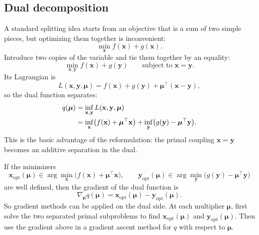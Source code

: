 \subsection{Dual decomposition}
\label{subsec:ch8-dual-decomposition}
A standard splitting idea starts from an objective that is a
sum of two simple pieces, but optimizing them together is inconvenient:
\[
  \min_{\mathbf{x}} f(\mathbf{x}) + g(\mathbf{x}).
\]
Introduce two copies of the variable and tie them together by an equality:
\begin{equation}
  \label{eq:ch8-dual-decomposition-primal}
  \min_{\mathbf{x},\mathbf{y}} f(\mathbf{x}) + g(\mathbf{y})
  \qquad
  \text{subject to }
  \mathbf{x}=\mathbf{y}.
\end{equation}
Its Lagrangian is
\[
  L(\mathbf{x},\mathbf{y},\boldsymbol{\mu})
  =
  f(\mathbf{x}) + g(\mathbf{y}) + \boldsymbol{\mu}^\top(\mathbf{x}-\mathbf{y}),
\]
so the dual function separates:
\begin{align}
  q(\boldsymbol{\mu})
  &=
  \inf_{\mathbf{x},\mathbf{y}}
  L(\mathbf{x},\mathbf{y},\boldsymbol{\mu}) \notag \\
  &=
  \inf_{\mathbf{x}}
  \bigl(f(\mathbf{x})+\boldsymbol{\mu}^\top \mathbf{x}\bigr)
  +
  \inf_{\mathbf{y}}
  \bigl(g(\mathbf{y})-\boldsymbol{\mu}^\top \mathbf{y}\bigr).
  \label{eq:ch8-dual-decomposition-q}
\end{align}
This is the basic advantage of the reformulation: the primal coupling
$\mathbf{x}=\mathbf{y}$ becomes an additive separation in the dual.

If the minimizers
\[
  \mathbf{x}_{\mathrm{opt}}(\boldsymbol{\mu})
  \in
  \arg\min_{\mathbf{x}}
  \bigl(f(\mathbf{x})+\boldsymbol{\mu}^\top \mathbf{x}\bigr),
  \qquad
  \mathbf{y}_{\mathrm{opt}}(\boldsymbol{\mu})
  \in
  \arg\min_{\mathbf{y}}
  \bigl(g(\mathbf{y})-\boldsymbol{\mu}^\top \mathbf{y}\bigr)
\]
are well defined, then the gradient of the dual function is
\[
  \nabla_{\boldsymbol{\mu}} q(\boldsymbol{\mu})
  =
  \mathbf{x}_{\mathrm{opt}}(\boldsymbol{\mu})
  -
  \mathbf{y}_{\mathrm{opt}}(\boldsymbol{\mu}).
\]
So gradient methods can be applied on the dual side. At each multiplier
$\boldsymbol{\mu}$, first solve the two separated primal subproblems to find
$\mathbf{x}_{\mathrm{opt}}(\boldsymbol{\mu})$ and
$\mathbf{y}_{\mathrm{opt}}(\boldsymbol{\mu})$. Then use the gradient above in
a gradient ascent method for $q$ with respect to $\boldsymbol{\mu}$.

